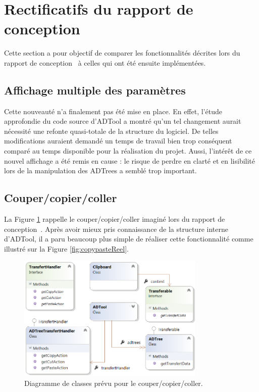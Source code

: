 \newpage
\section{Rectificatifs du rapport de conception}
\label{sec:rectConc}
    
    Cette section a pour objectif de comparer les fonctionnalités décrites lors du rapport de conception~\cite{conception} à celles qui ont été ensuite implémentées.

	\subsection{Affichage multiple des paramètres}

    Cette nouveauté n'a finalement pas été mise en place. En effet, l'étude approfondie du code source d'ADTool a montré qu'un tel changement aurait nécessité une refonte quasi-totale de la structure du logiciel. De telles modifications auraient demandé un temps de travail bien trop conséquent comparé au temps disponible pour la réalisation du projet. Aussi, l'intérêt de ce nouvel affichage a été remis en cause : le risque de perdre en clarté et en lisibilité lors de la manipulation des ADTrees a semblé trop important.

	\subsection{Couper/copier/coller}

	La {\sc Figure} \ref{fig:copypastePrevu} rappelle le couper/copier/coller imaginé lors du rapport de conception~\cite{conception}. Après avoir mieux pris connaissance de la structure interne d'ADTool, il a paru beaucoup plus simple de réaliser cette fonctionnalité comme illustré sur la {\sc Figure} \ref{fig:copypasteReel}.
	
	
		\begin{figure}[H]
            \centering
                \includegraphics[width=0.8\textwidth]{figure/copiercoller.png}
            \caption{Diagramme de classes prévu pour le couper/copier/coller.}
            \label{fig:copypastePrevu}
        \end{figure}
        
